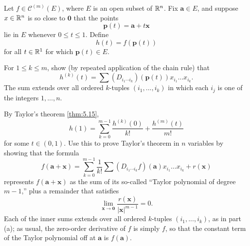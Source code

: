 \begin{myexercise}
    \label{ex:9.30}
    Let $f \in \mathscr{C}^{(m)} (E)$, 
    where $E$ is an open subset of ${\protect\mathbb R}^n$. 
    Fix $\mathbf{a} \in E$, and suppose $x \in {\protect\mathbb R}^n$ is so close to $\mathbf{0}$ that the points
    \begin{equation*}
        \mathbf{p}(t) = \mathbf{a} + t \mathbf{x}
    \end{equation*}
    lie in $E$ whenever $0 \leq t \leq 1$. 
    Define
    \begin{equation*}
        h(t) = f(\mathbf{p}(t))
    \end{equation*}
    for all $t \in {\protect\mathbb R}^1$ for which $\mathbf{p}(t) \in E$.
    \begin{asparaenum}[(a)]
        \item For $1 \leq k \leq m$, show (by repeated application of the chain rule) that 
        \begin{equation*}
            h^{(k)}(t) = \sum 
            \left( D_{i_1 \cdots i_k} \right) \left( \mathbf{p}(t) \right) 
            x_{i_1} \dots x_{i_k} .
        \end{equation*}
        The sum extends over all ordered $k$-tuples $(i_1, ... , i_k)$ in which each $i_j$ is one of the integers $1, ... , n$.
        \item By Taylor's theorem \ref{thm:5.15},
        \begin{equation*}
            h(1) = \sum_{k=0}^{m-1} \frac{h^{(k)}(0)}{k!} + \frac{h^{(m)}(t)}{m!}
        \end{equation*}
        for some $t \in (0, 1)$. 
        Use this to prove Taylor's theorem in $n$ variables by showing that the formula
        \begin{equation*}
            f(\mathbf{a+x}) = \sum_{k=0}^{m-1} \frac{1}{k!}
            \sum \left( D_{i_1 \cdots i_k} f \right)(\mathbf{a})
            x_{i_1} \dots x_{i_k} 
            + r(\mathbf{x})
        \end{equation*}
        represents $f(\mathbf{a + x})$ as the sum of its so-called ``Taylor polynomial of degree $m - 1$,'' plus a remainder that satisfies
        \begin{equation*}
            \lim_{\mathbf{x} \to \mathbf{0}} \frac{r(\mathbf{x})}{|\mathbf{x}|^{m-1}} = 0.
        \end{equation*}
        Each of the inner sums extends over all ordered $k$-tuples $(i_1, ... , i_k)$, as in part (a); 
        as usual, the zero-order derivative of $f$ is simply $f$, so that the constant term of the Taylor polynomial off at $\mathbf{a}$ is $f(\mathbf{a})$.

\end{asparaenum}
\end{myexercise}
